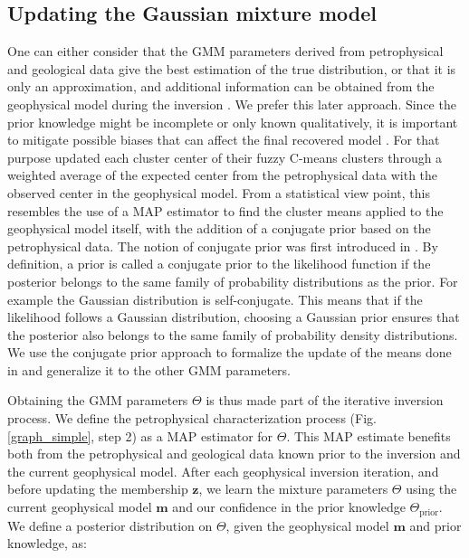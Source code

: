 \documentclass[extra]{gji} %
\begin{document}
\subsection{Updating the Gaussian mixture model} \label{UpdateTheta}

One can either consider that the GMM parameters derived from petrophysical and geological data give the best estimation of the true distribution, or that it is only an approximation, and additional information can be obtained from the geophysical model during the inversion \citep{Sun2015}. We prefer this later approach. Since the prior knowledge might be incomplete or only known qualitatively, it is important to mitigate possible biases that can affect the final recovered model \citep{McAuslan2015}. For that purpose \citeauthor{Sun2015} updated each cluster center of their fuzzy C-means clusters through a weighted average of the expected center from the petrophysical data with the observed center in the geophysical model. From a statistical view point, this resembles the use of a MAP estimator to find the cluster means applied to the geophysical model itself, with the addition of a conjugate prior based on the petrophysical data. The notion of conjugate prior was first introduced in \cite{conjugateprior}. By definition, a prior is called a conjugate prior to the likelihood function if the posterior belongs to the same family of probability distributions as the prior. For example the Gaussian distribution is self-conjugate. This means that if the likelihood follows a Gaussian distribution, choosing a Gaussian prior ensures that the posterior also belongs to the same family of probability density distributions. We use the conjugate prior approach to formalize the update of the means done in \cite{Sun2015} and generalize it to the other GMM parameters.

Obtaining the GMM parameters $\Theta$ is thus made part of the iterative inversion process. We define the petrophysical characterization process (Fig. \ref{graph_simple}, step 2) as a MAP estimator for $\Theta$. This MAP estimate benefits both from the petrophysical and geological data known prior to the inversion and the current geophysical model. After each geophysical inversion iteration, and before updating the membership $\mathbf{z}$, we learn the mixture parameters $\Theta$ using the current geophysical model $\mathbf{m}$ and our confidence in the prior knowledge $\Theta_{\text{prior}}$. We define a posterior distribution on $\Theta$, given the geophysical model $\mathbf{m}$ and prior knowledge, as:
\end{document}
